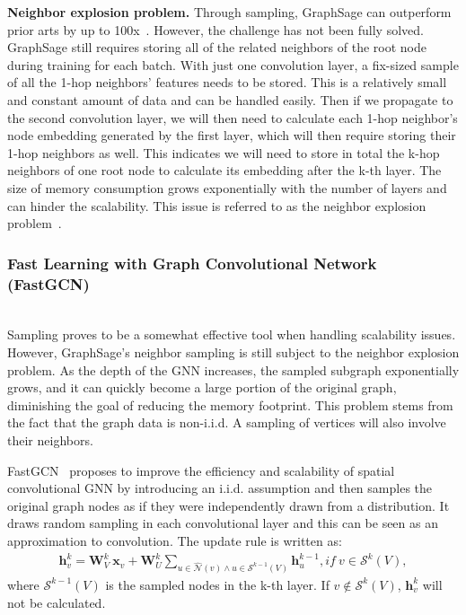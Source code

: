 \vspace{2mm}
\noindent \textbf{Neighbor explosion problem.} Through sampling, GraphSage can outperform prior arts by up to 100x~\cite{graphsage}. However, the challenge has not been fully solved. GraphSage still requires storing all of the related neighbors of the root node during training for each batch. With just one convolution layer, a fix-sized sample of all the 1-hop neighbors' features needs to be stored. This is a relatively small and constant amount of data and can be handled easily. Then if we propagate to the second convolution layer, we will then need to calculate each 1-hop neighbor's node embedding generated by the first layer, which will then require storing their 1-hop neighbors as well. This indicates we will need to store in total the k-hop neighbors of one root node to calculate its embedding after the k-th layer. The size of memory consumption grows exponentially with the number of layers and can hinder the scalability. This issue is referred to as the neighbor explosion problem~\cite{neiexplode}. 

\subsubsection{Fast Learning with Graph Convolutional Network (FastGCN)} \hfill \\

Sampling proves to be a somewhat effective tool when handling scalability issues. However, GraphSage's neighbor sampling is still subject to the neighbor explosion problem. As the depth of the GNN increases, the sampled subgraph exponentially grows, and it can quickly become a large portion of the original graph, diminishing the goal of reducing the memory footprint. This problem stems from the fact that the graph data is non-i.i.d. A sampling of vertices will also involve their neighbors. 

FastGCN~\cite{fastgcn} proposes to improve the efficiency and scalability of spatial convolutional GNN by introducing an i.i.d. assumption and then samples the original graph nodes as if they were independently drawn from a distribution. It draws random sampling in each convolutional layer and this can be seen as an approximation to convolution. The update rule is written as:
\begin{gather}
\mathbf{h}_v ^k = \mathbf{W}_V^k~\mathbf{x}_v + \mathbf{W}_U^k \sum_{u \in \hat {\mathcal {N}}(v) \land u \in \mathcal{S}^{k-1}(V)} \mathbf{h}_u^{k-1}, if~v \in \mathcal{S}^{k}(V),
\end{gather}
where $\mathcal{S}^{k-1}(V)$ is the sampled nodes in the k-th layer. If $v \notin \mathcal{S}^{k}(V)$, $\mathbf{h}_v ^k$ will not be calculated. 

